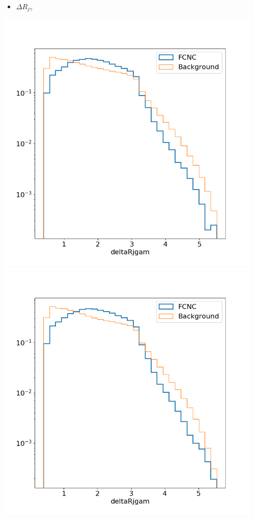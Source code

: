 \documentclass[10pt]{beamer}
\begin{document}
{\begin{columns}
\begin{column}{0.33\textwidth}
\end{column}
\begin{column}{0.33\textwidth}
\begin{itemize}
\item $\Delta R_{j\gamma}$
\end{itemize}
\includegraphics[width=.85\textwidth]{Images/ejetsvarplots/deltaRjgam.png} \\
\includegraphics[width=.85\textwidth]{Images/mujetsvarplots/deltaRjgam.png}
\end{column}

\end{columns}}
\end{document}
